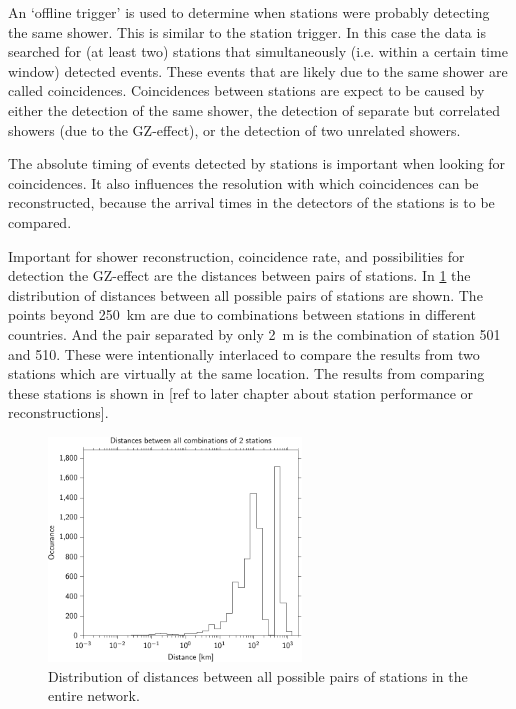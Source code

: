 An `offline trigger' is used to determine when stations were probably detecting the same shower. This is similar to the station trigger. In this case the data is searched for (at least two) stations that simultaneously (i.e. within a certain time window) detected events. These events that are likely due to the same shower are called coincidences. Coincidences between stations are expect to be caused by either the detection of the same shower, the detection of separate but correlated showers (due to the GZ-effect), or the detection of two unrelated showers.

The absolute timing of events detected by stations is important when looking for coincidences. It also influences the resolution with which coincidences can be reconstructed, because the arrival times in the detectors of the stations is to be compared.

Important for shower reconstruction, coincidence rate, and possibilities for detection the GZ-effect are the distances between pairs of stations. In \cref{fig:network_station_distances} the distribution of distances between all possible pairs of stations are shown. The points beyond \SI{250}{\kilo\meter} are due to combinations between stations in different countries. And the pair separated by only \SI{2}{\meter} is the combination of station 501 and 510. These were intentionally interlaced to compare the results from two stations which are virtually at the same location. The results from comparing these stations is shown in [ref to later chapter about station performance or reconstructions].

\begin{figure}
    \centering
    \includegraphics[width=0.6\textwidth]
                    {plots/cluster/network_station_distances}
    \caption{Distribution of distances between all possible pairs of stations in the entire \hisparc network.}
    \label{fig:network_station_distances}
\end{figure}



